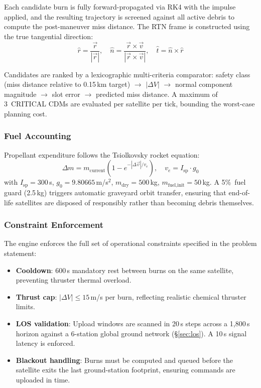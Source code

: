 \documentclass[10pt,twocolumn,letterpaper]{article}
\begin{document}
Each candidate burn is fully forward-propagated via RK4 with the impulse
applied, and the resulting trajectory is screened against all active debris
to compute the post-maneuver miss distance.  The RTN frame is
constructed using the true tangential direction:
\begin{equation}
  \hat{r} = \frac{\vec{r}}{|\vec{r}|}, \quad
  \hat{n} = \frac{\vec{r} \times \vec{v}}{|\vec{r} \times \vec{v}|}, \quad
  \hat{t} = \hat{n} \times \hat{r}
\end{equation}

\noindent
Candidates are ranked by a lexicographic multi-criteria comparator: safety
class (miss distance relative to 0.15\,km target) $\to$ $|\Delta V|$ $\to$
normal component magnitude $\to$ slot error $\to$ predicted miss distance.
A maximum of 3~CRITICAL CDMs are evaluated per satellite per tick,
bounding the worst-case planning cost.

\subsubsection{Fuel Accounting}

Propellant expenditure follows the Tsiolkovsky rocket equation:
%
\begin{equation}
  \Delta m = m_{\text{current}} \!\left(1 - e^{-|\Delta\vec{v}| / v_e}\right),
  \quad v_e = I_{\text{sp}} \cdot g_0
\label{eq:tsiolkovsky}
\end{equation}
%
with $I_{\text{sp}} = 300$\,s, $g_0 = 9.80665$\,m/s$^2$,
$m_{\text{dry}} = 500$\,kg, $m_{\text{fuel,init}} = 50$\,kg.
A 5\%~fuel guard (2.5\,kg) triggers automatic graveyard orbit transfer,
ensuring that end-of-life satellites are disposed of responsibly rather
than becoming debris themselves.

\subsubsection{Constraint Enforcement}

The engine enforces the full set of operational constraints specified in
the problem statement:

\begin{itemize}[nosep,leftmargin=*]
  \item \textbf{Cooldown}: 600\,s mandatory rest between burns on the same
    satellite, preventing thruster thermal overload.
  \item \textbf{Thrust cap}: $|\Delta V| \leq 15$\,m/s per burn,
    reflecting realistic chemical thruster limits.
  \item \textbf{LOS validation}: Upload windows are scanned in 20\,s steps
    across a 1{,}800\,s horizon against a 6-station global ground
    network (\S\ref{sec:los}).  A 10\,s signal latency is enforced.
  \item \textbf{Blackout handling}: Burns must be computed and queued
    before the satellite exits the last ground-station footprint,
    ensuring commands are uploaded in time.
\end{itemize}
\end{document}

